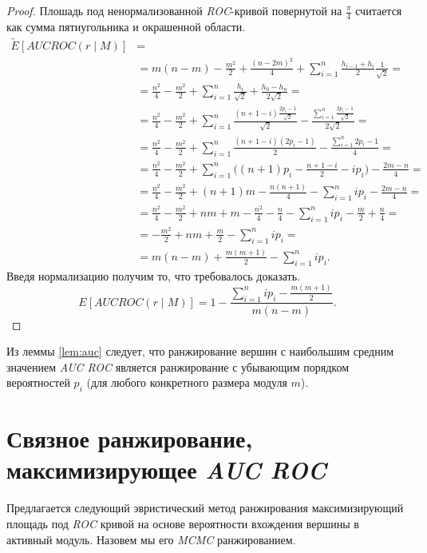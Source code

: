 \begin{proof}
    Плошадь под ненормализованной \emph{ROC}-кривой  повернутой на
    $\frac{\pi}{4}$ считается как сумма пятиугольника и окрашенной области.
    \begin{align*}
        \tilde{E}[AUC ROC(r \mid M)] &=\\
        &= m(n-m) - \frac{m^2}{2}+\frac{(n-2m)^2}{4} + 
            \sum_{i=1}^{n} \frac{h_{i-1}+h_{i}}{2}\frac{1}{\sqrt{2}} = \\
        &= \frac{n^2}{4} - \frac{m^2}{2} +
            \sum_{i=1}^{n} \frac{h_i}{\sqrt{2}} + \frac{h_0 - h_n}{2\sqrt{2}} = \\
        &= \frac{n^2}{4} - \frac{m^2}{2} +
            \sum_{i=1}^{n} \frac{(n+1-i)\frac{2p_i-1}{\sqrt{2}}}{\sqrt{2}} - \frac{\sum_{i=1}^{n} \frac{2p_i-1}{\sqrt{2}}}{2\sqrt{2}} = \\
        &= \frac{n^2}{4} - \frac{m^2}{2} +
            \sum_{i=1}^{n} \frac{(n+1-i)(2p_i-1)}{2} - \frac{\sum_{i=1}^{n} 2p_i-1}{4} = \\
        &= \frac{n^2}{4} - \frac{m^2}{2} +
            \sum_{i=1}^{n} \bigg((n+1)p_i - \frac{n+1-i}{2} -ip_i\bigg)- \frac{2m-n}{4} = \\
        &= \frac{n^2}{4} - \frac{m^2}{2} +
            (n+1)m - \frac{n(n+1)}{4} - \sum_{i=1}^{n}ip_i -\frac{2m-n}{4} = \\
        &= \frac{n^2}{4} - \frac{m^2}{2} +
            nm + m - \frac{n^2}{4} - \frac{n}{4} - \sum_{i=1}^{n}ip_i -\frac{m}{2} + \frac{n}{4} = \\
        &=  - \frac{m^2}{2} +
            nm + \frac{m}{2} - \sum_{i=1}^{n}ip_i = \\
        &=  m(n-m) + \frac{m(m+1)}{2} - \sum_{i=1}^{n}ip_i.
    \end{align*}
    Введя нормализацию получим то, что требовалось доказать.
    \[E[AUC ROC(r \mid M)] = 1 - \frac{\sum_{i=1}^{n}ip_i - \frac{m(m+1)}{2}}{m(n-m)}.\]
\end{proof}

Из леммы \ref{lem:auc} следует, что ранжирование вершин с наибольшим средним
значением \emph{AUC ROC} является ранжирование с убывающим порядком
вероятностей $p_i$ (для любого конкретного размера модуля $m$).





\section{Связное ранжирование, максимизирующее \emph{AUC ROC}}
Предлагается следующий эвристический метод ранжирования максимизирующий площадь
под \emph{ROC} кривой на основе вероятности вхождения вершины в активный модуль.
Назовем мы его \emph{MCMC} ранжированием.

